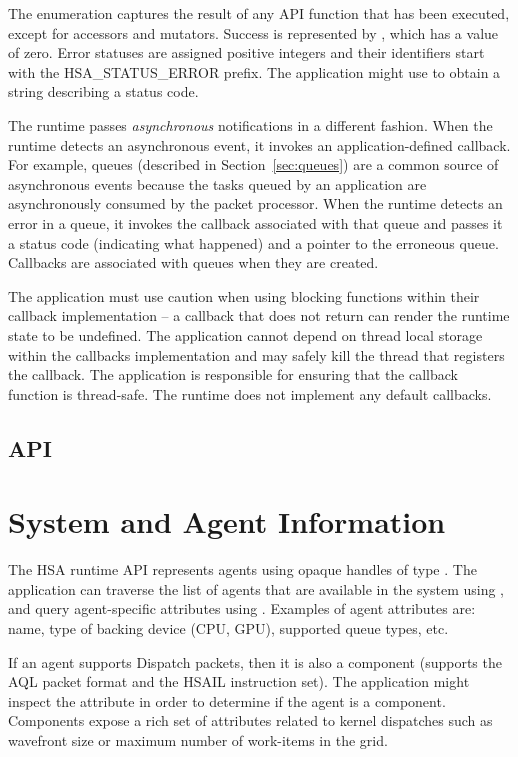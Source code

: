 \documentclass[final]{book}
\newcommand{\reftyp}[1]{#1}
\newcommand{\refenu}[1]{\reftyp{#1}}
\begin{document}
The  enumeration captures the result of any API function
that has been executed, except for accessors and mutators. Success is
represented by , which has a value of zero. Error
statuses are assigned positive integers and their identifiers start with the
\refenu{HSA_STATUS_ERROR} prefix. The application might use
 to obtain a string describing a status code.

The runtime passes \textit{asynchronous} notifications in a different
fashion. When the runtime detects an asynchronous event, it invokes an
application-defined callback. For example, queues (described in
Section~\ref{sec:queues}) are a common source of asynchronous events because the
tasks queued by an application are asynchronously consumed by the packet
processor. When the runtime detects an error in a queue, it invokes the callback
associated with that queue and passes it a status code (indicating what
happened) and a pointer to the erroneous queue. Callbacks are associated with
queues when they are created.

The application must use caution when using blocking functions within their
callback implementation -- a callback that does not return can render the
runtime state to be undefined. The application cannot depend on thread local
storage within the callbacks implementation and may safely kill the thread that
registers the callback. The application is responsible for ensuring that
the callback function is thread-safe. The runtime does not implement any default
callbacks.

\subsection{API}


\section{System and Agent Information}
\label{sec:agentinfo}

The HSA runtime API represents agents using opaque handles of type
. The application can traverse the list of agents that are
available in the system using , and query
agent-specific attributes using . Examples of agent
attributes are: name, type of backing device (CPU, GPU), supported queue types,
etc.

If an agent supports Dispatch packets, then it is also a component (supports the
AQL packet format and the HSAIL instruction set). The application might inspect
the  attribute in order to determine if the agent
is a component. Components expose a rich set of attributes related to kernel
dispatches such as wavefront size or maximum number of work-items in the grid.
\end{document}
